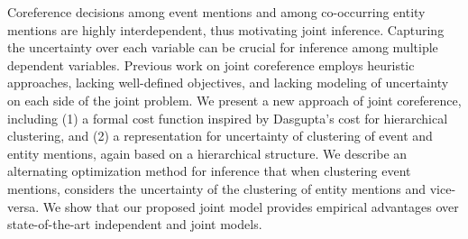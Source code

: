 Coreference decisions among event mentions and among co-occurring entity mentions are highly interdependent, thus motivating joint inference. Capturing the uncertainty over each variable can be crucial for inference among multiple dependent variables. Previous work on joint coreference employs heuristic approaches, lacking well-defined objectives, and lacking modeling of uncertainty on each side of the joint problem. We present a new approach of joint coreference, including (1) a formal cost function inspired by Dasgupta's cost for hierarchical clustering, and (2) a representation for uncertainty of clustering of event and entity mentions, again based on a hierarchical structure.  We describe an alternating optimization method for inference that when clustering event mentions, considers the uncertainty of the clustering of entity mentions and vice-versa. We show that our proposed joint model provides empirical advantages over state-of-the-art independent and joint models.
